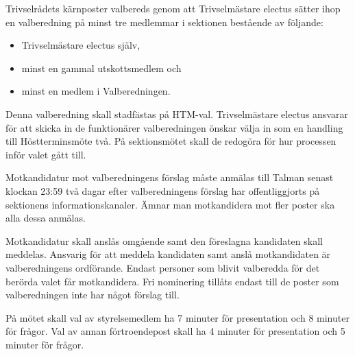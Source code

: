 \documentclass{dsekpolicy}
\begin{document}
Trivselrådets kärnposter valbereds genom att Trivselmästare electus sätter ihop
en valberedning på minst tre medlemmar i sektionen bestående av följande:
\begin{itemize}
\item Trivselmästare electus själv,
\item minst en gammal utskottsmedlem och
\item minst en medlem i Valberedningen.
\end{itemize}

Denna valberedning skall stadfästas på HTM-val. Trivselmästare electus ansvarar
för att skicka in de funktionärer valberedningen önskar välja in som en handling
till Höstterminsmöte två. På sektionsmötet skall de redogöra för hur processen
inför valet gått till.

Motkandidatur mot valberedningens förslag måste anmälas till Talman senast
klockan 23:59 två dagar efter valberedningens förslag har offentliggjorts på
sektionens informationskanaler. Ämnar man motkandidera mot fler poster ska alla
dessa anmälas.

Motkandidatur skall anslås omgående samt den föreslagna kandidaten skall
meddelas. Ansvarig för att meddela kandidaten samt anslå motkandidaten är
valberedningens ordförande. Endast personer som blivit valberedda för det
berörda valet får motkandidera.  Fri nominering tillåts endast till de poster
som valberedningen inte har något förslag till.

På mötet skall val av styrelsemedlem ha 7 minuter för presentation och 8 minuter
för frågor. Val av annan förtroendepost skall ha 4 minuter för presentation och
5 minuter för frågor.
\end{document}
